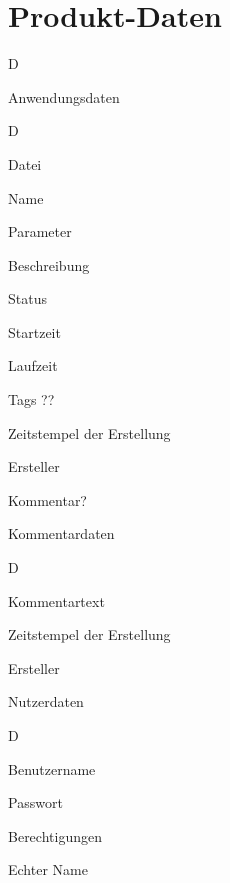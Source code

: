 \section{Produkt-Daten}

\begin{anforderung}{D}
    \item \label{anwendungs_daten} Anwendungsdaten
    \begin{subanforderung}{D}
    	\item Datei
        \item Name
        \item Parameter
        \item Beschreibung
        \item Status
        \item Startzeit
        \item Laufzeit
        \item Tags ??
        \item Zeitstempel der Erstellung
        \item \label{experiment_ersteller} Ersteller
        \item Kommentar?
    \end{subanforderung}

    \item \label{kommentar_daten} Kommentardaten
    \begin{subanforderung}{D}
        \item Kommentartext
        \item Zeitstempel der Erstellung
        \item \label{kommentar_ersteller} Ersteller
    \end{subanforderung}

    \item \label{nutzer_daten}Nutzerdaten
    \begin{subanforderung}{D}
        \item Benutzername
        \item Passwort
        \item Berechtigungen
        \item Echter Name
    \end{subanforderung}
\end{anforderung}
\newpage
